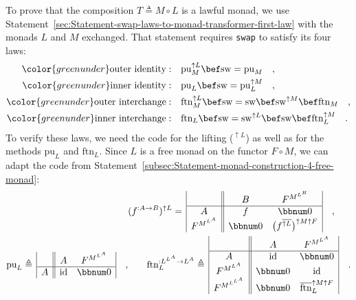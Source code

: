 To prove that the composition $T\triangleq M\circ L$ is a lawful
monad, we use Statement~\ref{sec:Statement-swap-laws-to-monad-transformer-first-law}
with the monads $L$ and $M$ exchanged. That statement requires \lstinline!swap!
to satisfy its four laws:
\begin{align*}
{\color{greenunder}\text{outer identity}:}\quad & \text{pu}_{M}^{\uparrow L}\bef\text{sw}=\text{pu}_{M}\quad,\\
{\color{greenunder}\text{inner identity}:}\quad & \text{pu}_{L}\bef\text{sw}=\text{pu}_{L}^{\uparrow M}\quad,\\
{\color{greenunder}\text{outer interchange}:}\quad & \text{ftn}_{M}^{\uparrow L}\bef\text{sw}=\text{sw}\bef\text{sw}^{\uparrow M}\bef\text{ftn}_{M}\quad,\\
{\color{greenunder}\text{inner interchange}:}\quad & \text{ftn}_{L}\bef\text{sw}=\text{sw}^{\uparrow L}\bef\text{sw}\bef\text{ftn}_{L}^{\uparrow M}\quad.
\end{align*}
To verify these laws, we need the code for the lifting ($^{\uparrow L}$)
as well as for the methods $\text{pu}_{L}$ and $\text{ftn}_{L}$.
Since $L$ is a free monad on the functor $F\circ M$, we can adapt
the code from Statement~\ref{subsec:Statement-monad-construction-4-free-monad}:
\begin{align*}
 & (f^{:A\rightarrow B})^{\uparrow L}=\,\begin{array}{|c||cc|}
 & B & F^{M^{L^{B}}}\\
\hline A & f & \bbnum 0\\
F^{M^{L^{A}}} & \bbnum 0 & \big(f^{\overline{\uparrow L}}\big)^{\uparrow M\uparrow F}
\end{array}\quad,\\
\text{pu}_{L}\triangleq\,\begin{array}{|c||cc|}
 & A & F^{M^{L^{A}}}\\
\hline A & \text{id} & \bbnum 0
\end{array}\quad, & \quad\quad\text{ftn}_{L}^{:L^{L^{A}}\rightarrow L^{A}}\triangleq\,\begin{array}{|c||cc|}
 & A & F^{M^{L^{A}}}\\
\hline A & \text{id} & \bbnum 0\\
F^{M^{L^{A}}} & \bbnum 0 & \text{id}\\
F^{M^{L^{L^{A}}}} & \bbnum 0 & \overline{\text{ftn}}_{L}^{\uparrow M\uparrow F}
\end{array}\quad.
\end{align*}

